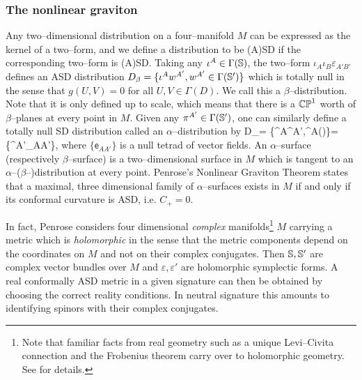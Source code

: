 \subsubsection{The nonlinear graviton}
Any two--dimensional distribution on a four--manifold $M$ can be expressed as the kernel of a two--form, and we define a distribution to be (A)SD if the corresponding two--form is (A)SD. Taking any $\iota^A\in\Gamma(\mathbb{S})$, the two--form $\iota_A\iota_B\varepsilon_{A'B'}$ defines an ASD distribution $D_\beta=\{\iota^Aw^{A'},w^{A'}\in\Gamma(\mathbb{S}')\}$ which is totally null in the sense that $g(U,V)=0$ for all $U,V\in\Gamma(D)$. We call this a $\beta$--distribution. Note that it is only defined up to scale, which means that there is a $\mathbb{CP}^1$ worth of $\beta$--planes at every point in $M$. Given any $\pi^{A'}\in\Gamma(\mathbb{S}')$, one can similarly define a totally null SD distribution called an $\alpha$--distribution by
\be \label{eq:alpha_dist}
D_\alpha = \{\iota^A\pi^{A'},\iota^{A}\in\Gamma(\spp)\}=\{\pi^{A'}_{AA'}\},
\ee
where $\{\mathsf{e}_{AA'}\}$ is a null tetrad of vector fields.  An $\alpha$--surface (respectively $\beta$--surface) is a two--dimensional surface in $M$ which is tangent to an $\alpha$--($\beta$--)distribution at every point. Penrose's Nonlinear Graviton Theorem \cite{penrose} states that a 
maximal, three dimensional family of $\alpha$--surfaces exists in $M$ if and only if its conformal curvature is ASD, i.e. $C_+=0$.

In fact, Penrose considers four dimensional \textit{complex} manifolds\footnote{Note that familiar facts from real geometry such as a unique Levi--Civita connection and the Frobenius theorem carry over to holomorphic geometry. See \cite{LeBrun83} for details.} $M$ carrying a metric which is \textit{holomorphic} in the sense that the metric components depend on the coordinates on $M$ and not on their complex conjugates. Then $\mathbb{S},\mathbb{S}'$ are complex vector bundles over $M$ and $\varepsilon,\varepsilon'$ are holomorphic symplectic forms. A real conformally ASD metric in a given signature can then be obtained by choosing the correct reality conditions. In neutral signature this amounts to identifying spinors with their complex conjugates. 

